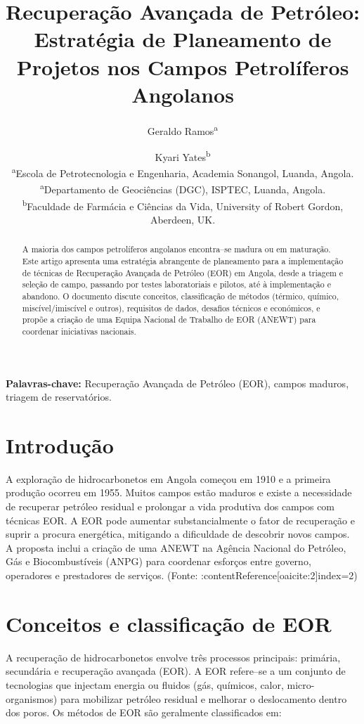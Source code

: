 \documentclass[11pt,a4paper]{article}
\title{Recuperação Avançada de Petróleo: \\ Estratégia de Planeamento de Projetos nos Campos Petrolíferos Angolanos}
\author{Geraldo Ramos\textsuperscript{a} \and Kyari Yates\textsuperscript{b} \\
\small \textsuperscript{a}Escola de Petrotecnologia e Engenharia, Academia Sonangol, Luanda, Angola. \\
\small \textsuperscript{a}Departamento de Geociências (DGC), ISPTEC, Luanda, Angola. \\
\small \textsuperscript{b}Faculdade de Farmácia e Ciências da Vida, University of Robert Gordon, Aberdeen, UK.}
\date{}
\begin{document}
\maketitle


\begin{abstract}
A maioria dos campos petrolíferos angolanos encontra--se madura ou em maturação. 
Este artigo apresenta uma estratégia abrangente de planeamento para a implementação de técnicas de Recuperação Avançada de Petróleo (EOR) em Angola, desde a triagem e seleção de campo, passando por testes laboratoriais e pilotos, até à implementação e abandono. O documento discute conceitos, classificação de métodos (térmico, químico, miscível/imiscível e outros), requisitos de dados, desafios técnicos e económicos, e propõe a criação de uma Equipa Nacional de Trabalho de EOR (ANEWT) para coordenar iniciativas nacionais. 
\end{abstract}

\noindent \textbf{Palavras-chave:} Recuperação Avançada de Petróleo (EOR), campos maduros, triagem de reservatórios.

\section{Introdução}
A exploração de hidrocarbonetos em Angola começou em 1910 e a primeira produção ocorreu em 1955. Muitos campos estão maduros e existe a necessidade de recuperar petróleo residual e prolongar a vida produtiva dos campos com técnicas EOR. A EOR pode aumentar substancialmente o fator de recuperação e suprir a procura energética, mitigando a dificuldade de descobrir novos campos. A proposta inclui a criação de uma ANEWT na Agência Nacional do Petróleo, Gás e Biocombustíveis (ANPG) para coordenar esforços entre governo, operadores e prestadores de serviços. (Fonte: :contentReference[oaicite:2]{index=2})

\section{Conceitos e classificação de EOR}
A recuperação de hidrocarbonetos envolve três processos principais: primária, secundária e recuperação avançada (EOR). A EOR refere--se a um conjunto de tecnologias que injectam energia ou fluidos (gás, químicos, calor, micro-organismos) para mobilizar petróleo residual e melhorar o deslocamento dentro dos poros. Os métodos de EOR são geralmente classificados em:
\end{document}
